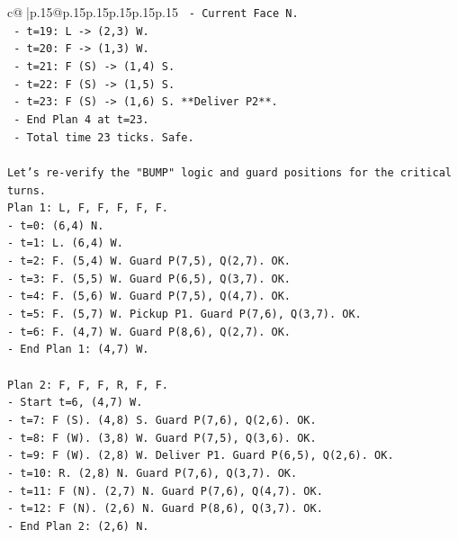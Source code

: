 \documentclass{article}
\begin{document}
{\begin{supertabular}{c@{$\;$}|p{.15\linewidth}@{}p{.15\linewidth}p{.15\linewidth}p{.15\linewidth}p{.15\linewidth}p{.15\linewidth}}
{{{\texttt{                {-} Current Face N.} \\
\texttt{                {-} t=19: L {-}> (2,3) W.} \\
\texttt{                {-} t=20: F {-}> (1,3) W.} \\
\texttt{                {-} t=21: F (S) {-}> (1,4) S.} \\
\texttt{                {-} t=22: F (S) {-}> (1,5) S.} \\
\texttt{                {-} t=23: F (S) {-}> (1,6) S. **Deliver P2**.} \\
\texttt{                {-} End Plan 4 at t=23.} \\
\texttt{                {-} Total time 23 ticks. Safe.} \\
\\ 
\texttt{Let's re{-}verify the "BUMP" logic and guard positions for the critical turns.} \\
\texttt{Plan 1: L, F, F, F, F, F.} \\
\texttt{{-} t=0: (6,4) N.} \\
\texttt{{-} t=1: L. (6,4) W.} \\
\texttt{{-} t=2: F. (5,4) W. Guard P(7,5), Q(2,7). OK.} \\
\texttt{{-} t=3: F. (5,5) W. Guard P(6,5), Q(3,7). OK.} \\
\texttt{{-} t=4: F. (5,6) W. Guard P(7,5), Q(4,7). OK.} \\
\texttt{{-} t=5: F. (5,7) W. Pickup P1. Guard P(7,6), Q(3,7). OK.} \\
\texttt{{-} t=6: F. (4,7) W. Guard P(8,6), Q(2,7). OK.} \\
\texttt{{-} End Plan 1: (4,7) W.} \\
\\ 
\texttt{Plan 2: F, F, F, R, F, F.} \\
\texttt{{-} Start t=6, (4,7) W.} \\
\texttt{{-} t=7: F (S). (4,8) S. Guard P(7,6), Q(2,6). OK.} \\
\texttt{{-} t=8: F (W). (3,8) W. Guard P(7,5), Q(3,6). OK.} \\
\texttt{{-} t=9: F (W). (2,8) W. Deliver P1. Guard P(6,5), Q(2,6). OK.} \\
\texttt{{-} t=10: R. (2,8) N. Guard P(7,6), Q(3,7). OK.} \\
\texttt{{-} t=11: F (N). (2,7) N. Guard P(7,6), Q(4,7). OK.} \\
\texttt{{-} t=12: F (N). (2,6) N. Guard P(8,6), Q(3,7). OK.} \\
\texttt{{-} End Plan 2: (2,6) N.} \\
}}}
\end{supertabular}}
\end{document}
